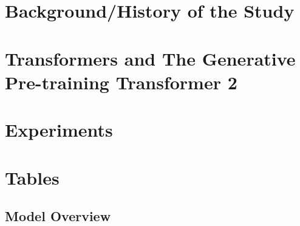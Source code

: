 \documentclass[english]{report}
\begin{document}
\vspace{5mm}


\newpage

\tableofcontents

\newpage
\listoffigures
\listoftables
\newpage
{}

	


\chapter{Background/History of the Study}



\chapter{Transformers and The Generative Pre-training Transformer 2}



\chapter{Experiments}



\appendix





\newpage
	
\chapter{Tables}
	
\section{Model Overview}
	
\end{document}
